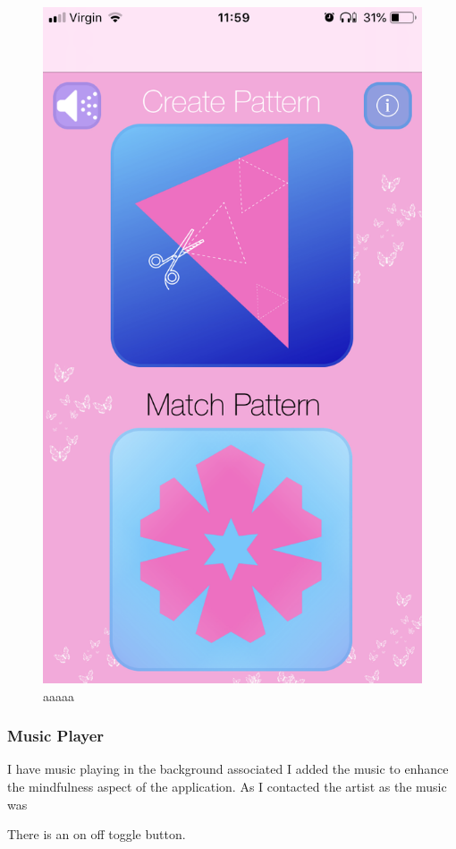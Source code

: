 \documentclass[11pt]{article}
\begin{document}
\begin{figure}[!ht]
\begin{minipage}{0.45\textwidth}
                            \includegraphics[width=0.7\linewidth]{KiriZen/main.png}
                            \caption{aaaaa}
                            \label{fig:kiriZen-main}
                        \end{minipage}
                    \end{figure}
            
             \subsubsection{Music Player}
                I have music playing in the background associated
                I added the music to enhance the mindfulness aspect of the application. As  I contacted the artist as the music was
                
                There is an on off toggle button. 
                
                
\end{document}
